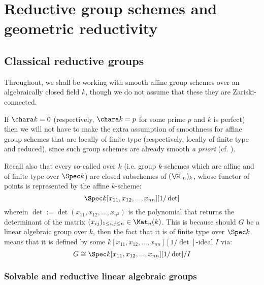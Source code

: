 \section{Reductive group schemes and geometric reductivity}
    \subsection{Classical reductive groups}
        \begin{convention} \label{conv: classical_reductive_groups_ground_field}
            Throughout, we shall be working with smooth affine group schemes over an algebraically closed field $k$, though we do not assume that these they are Zariski-connected.
        \end{convention}
        \begin{remark}
            If $\chara k = 0$ (respectively, $\chara k = p$ for some prime $p$ and $k$ is perfect) then we will not have to make the extra assumption of smoothness for affine group schemes that are locally of finite type (respectively, locally of finite type and reduced), since such group schemes are already smooth \textit{a priori} (cf. \cite[\href{https://stacks.math.columbia.edu/tag/047N}{Tag 047N} and \href{https://stacks.math.columbia.edu/tag/047P}{Tag 047P}]{stacks}).
        \end{remark}
        \begin{remark}
            Recall also that every so-called  over $k$ (i.e. group $k$-schemes which are affine and of finite type over $\Spec k$) are closed subschemes of $(\GL_n)_k$, whose functor of points is represented by the affine $k$-scheme:
                $$\Spec k[x_{11}, x_{12}, ..., x_{nn}][1/\det]$$
            wherein $\det := \det(x_{11}, x_{12}, ..., x_{n^2})$ is the polynomial that returns the determinant of the matrix $(x_{ij})_{1 \leq i, j \leq n} \in \Mat_n(k)$. This is because should $G$ be a linear algebraic group over $k$, then the fact that it is of finite type over $\Spec k$ means that it is defined by some $k[x_{11}, x_{12}, ..., x_{nn}][1/\det]$-ideal $I$ via:
                $$G \cong \Spec k[x_{11}, x_{12}, ..., x_{nn}][1/\det]/I$$
        \end{remark}
    
        \subsubsection{Solvable and reductive linear algebraic groups}
        
